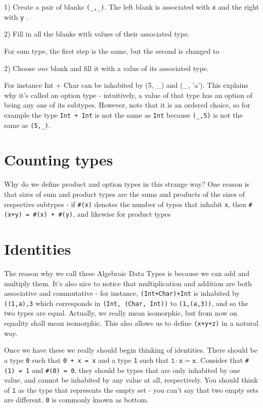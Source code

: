 \documentclass{article}
\begin{document}
1) Create a pair of blanks \verb!(_,_)!. The left blank is associated with \verb!x! and the right with \verb!y!
.

2) Fill in all the blanks with values of their associated type.

For sum type, the first step is the same, but the second is changed to

2) Choose \emph{one} blank and fill it with a value of its associated type.

For instance Int + Char can be inhabited by (5, \_) and (\_, 'a'). This explains why it's called an option type - intuitively, a value of that type has an option of being any one of its subtypes. However, note that it is an ordered choice, so for example the type \verb!Int + Int! is not the same as \verb!Int! because \verb!(_,5)! is not the same as \verb!(5,_)!.

\section{Counting types}

Why do we define product and option types in this strange way? One reason is that sizes of sum and product types are the sums and products of the sizes of respective subtypes - if \verb!#(x)! denotes the number of types that inhabit \verb!x!, then \verb!#(x+y) = #(x) + #(y)!, and likewise for product types

\section{Identities}

The reason why we call these Algebraic Data Types is because we can add and multiply them. It's also nice to notice that multiplication and addition are both associative and commutative - for instance, \verb!(Int+Char)+Int! is inhabited by \verb!((1,a),3! which corresponds in \verb!(Int, (Char, Int))! to \verb!(1,(a,3))!, and so the two types are equal. Actually, we really mean isomorphic, but from now on equality shall mean isomorphic. This also allows us to define \verb!(x+y+z)! in a natural way.

Once we have these we really should begin thinking of identities. There should be a type \verb!0! such that \verb!0 + x = x! and a type \verb!1! such that $\mathtt{1\cdot x = x}$. Consider that \verb!#(1) = 1! and \verb!#(0) = 0!, they should be types that are only inhabited by one value, and cannot be inhabited by any value at all, respectively. You should think of \verb!1! as the type that represents the empty set - you can't say that two empty sets are different. \verb!0! is commonly known as bottom.
\end{document}
